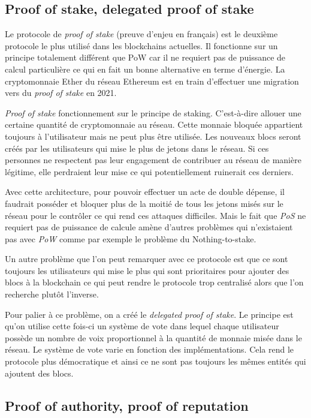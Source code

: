 \documentclass[../tb_report.tex]{subfiles}
\begin{document}
\subsection{Proof of stake, delegated proof of stake}
\label{consensus:pos}

Le protocole de \textit{proof of stake} (preuve d'enjeu en français) est le deuxième protocole le plus utilisé dans les blockchains actuelles. Il fonctionne sur un principe totalement différent que PoW car il ne requiert pas de puissance de calcul particulière ce qui en fait un bonne alternative en terme d'énergie. La cryptomonnaie Ether du réseau Ethereum est en train d'effectuer une migration vers du \textit{proof of stake} en 2021.

\textit{Proof of stake} fonctionnement sur le principe de staking. C'est-à-dire allouer une certaine quantité de cryptomonnaie au réseau. Cette monnaie bloquée appartient toujours à l'utilisateur mais ne peut plus être utilisée. Les nouveaux blocs seront créés par les utilisateurs qui mise le plus de jetons dans le réseau. Si ces personnes ne respectent pas leur engagement de contribuer au réseau de manière légitime, elle perdraient leur mise ce qui potentiellement ruinerait ces derniers. 

Avec cette architecture, pour pouvoir effectuer un acte de double dépense, il faudrait posséder et bloquer plus de la moitié de tous les jetons misés sur le réseau pour le contrôler ce qui rend ces attaques difficiles. Mais le fait que \textit{PoS} ne requiert pas de puissance de calcule amène d'autres problèmes qui n'existaient pas avec \textit{PoW} comme par exemple le problème du Nothing-to-stake.

Un autre problème que l'on peut remarquer avec ce protocole est que ce sont toujours les utilisateurs qui mise le plus qui sont prioritaires pour ajouter des blocs à la blockchain ce qui peut rendre le protocole trop centralisé alors que l'on recherche plutôt l'inverse.

Pour palier à ce problème, on a créé le \textit{delegated proof of stake}. Le principe est qu'on utilise cette fois-ci un système de vote dans lequel chaque utilisateur possède un nombre de voix proportionnel à la quantité de monnaie misée dans le réseau. Le système de vote varie en fonction des implémentations. Cela rend le protocole plus démocratique et ainsi ce ne sont pas toujours les mêmes entités qui ajoutent des blocs.

\subsection{Proof of authority, proof of reputation}
\label{consensus:poa}
\end{document}
